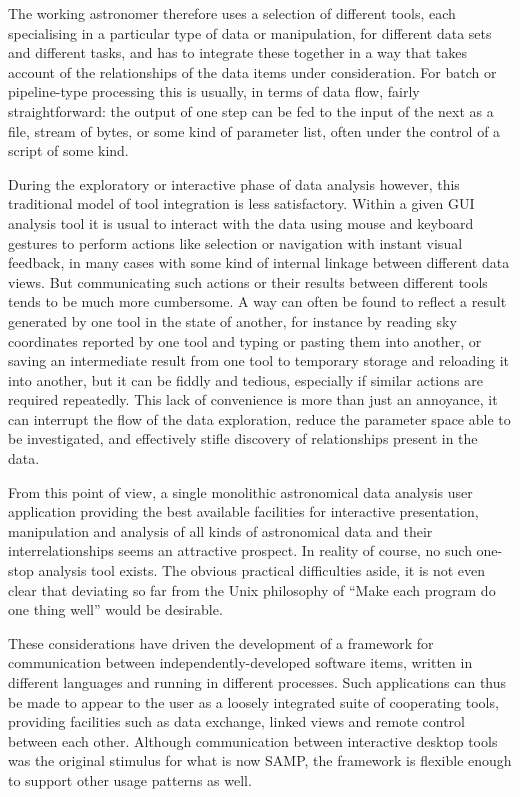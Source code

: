 \documentclass[5p]{elsarticle}
\begin{document}
The working astronomer therefore uses a selection of different tools,
each specialising in a particular type of data or manipulation,
for different data sets and different tasks,
and has to integrate these together in a way that takes account of
the relationships of the data items under consideration.
For batch or pipeline-type processing this is usually, in terms of
data flow, fairly straightforward: the output of one step can be
fed to the input of the next as a file, stream of bytes, or some
kind of parameter list, often under the control of a script of some kind.

During the exploratory or interactive phase of data analysis however,
this traditional model of tool integration is less satisfactory.
Within a given GUI analysis
tool it is usual to interact with the data using
mouse and keyboard gestures to perform actions like selection or
navigation with instant visual feedback, in many cases with some
kind of internal linkage between different data views.
But communicating such actions or their results between different
tools tends to be much more cumbersome.
A way can often be found to reflect a result generated by one tool
in the state of another, for instance by reading sky coordinates
reported by one tool and typing or pasting them into another,
or saving an intermediate result from one tool to temporary storage
and reloading it into another, but it can be fiddly and tedious,
especially if similar actions are required repeatedly.
This lack of convenience is more than just an annoyance, it can
interrupt the flow of the data exploration, reduce the parameter
space able to be investigated, and effectively stifle discovery
of relationships present in the data.


From this point of view, a single monolithic astronomical data analysis
user application providing the best available facilities for
interactive presentation, manipulation and analysis of all kinds of
astronomical data and their interrelationships seems an attractive prospect.
In reality of course, no such one-stop analysis tool exists.
The obvious practical difficulties aside, it is not even clear
that deviating so far from the Unix philosophy of
``Make each program do one thing well'' \citep{mcilroy1978}
would be desirable.

These considerations have driven the development of a framework
for communication between independently-developed software items,
written in different languages and running in different processes.
Such applications can thus be made to appear to the user
as a loosely integrated suite of cooperating tools,
providing facilities such as data exchange, linked views and
remote control between each other.
Although communication between interactive desktop tools was the
original stimulus for what is now SAMP, the framework is flexible
enough to support other usage patterns as well.
\end{document}
